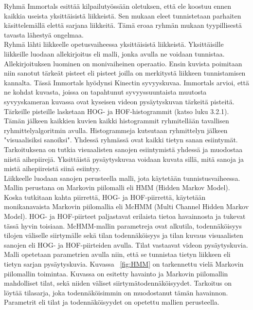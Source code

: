 Ryhmä Immortals esittää kilpailutyössään oletuksen, että ele koostuu ennen kaikkia useista yksittäisistä liikkeistä. 
Sen mukaan eleet tunnistetaan parhaiten käsittelemällä elettä sarjana liikkeitä. Tämä eroaa ryhmän mukaan tyypillisestä 
tavasta lähestyä ongelmaa. \citep {6239185}\\

Ryhmä lähti liikkeelle opetusvaiheessa yksittäisistä liikkeistä. Yksittäisille liikkeille luodaan allekirjoitus eli malli,
jonka avulla ne voidaan tunnistaa. Allekirjoituksen luominen on monivaiheinen operaatio. Ensin kuvista poimitaan niin sanotut
tärkeät pisteet eli pisteet joilla on merkitystä liikkeen tunnistamisen kannalta. Tässä Immortals hyödynsi Kinectin syvyyskuvaa.
Immortals arvioi, että ne kohdat kuvasta, joissa on tapahtunut syvyyssuuntaista muutosta syvyyskameran kuvassa ovat kyseisen videon pysäytyskuvan
tärkeitä pisteitä. Tärkeille pisteille lasketaan HOG- ja HOF-histogrammit (katso luku 3.2.1). 
Tämän jälkeen kaikkien kuvien kaikki histogrammit ryhmitellään tavallisen ryhmittelyalgoritmin avulla.
Histogrammeja kutsutaan ryhmittelyn jälkeen "visuaalisiksi sanoiksi". Yhdessä ryhmässä ovat kaikki tietyn sanan esiintymät.
Tarkoituksena on tutkia visuaalisten sanojen esiintymistä yhdessä ja muodostaa niistä aihepiirejä. 
Yksittäistä pysäytyskuvaa voidaan kuvata sillä, mitä sanoja ja mistä aihepiireistä siinä esiintyy. \citep {6239185}\\

Liikkeelle luodaan sanojen perusteella malli, jota käytetään tunnistusvaiheessa. Mallin perustana on Markovin piilomalli
eli HMM (Hidden Markov Model). Koska tutkitaan kahta piirrettä, HOG- ja HOF-piirrettä, käytetään monikanavaista Markovin piilomallia
 eli McHMM (Multi Channel Hidden Markov Model). HOG- ja HOF-piirteet paljastavat erilaista tietoa havainnosta ja tukevat tässä hyvin toisiaan. 
 McHMM-mallin parametreja ovat alkutila, todennäköisyys tilojen väliselle siirtymälle sekä tilan todennäköisyys ja tilan kuvaus visuaalisten 
 sanojen eli HOG- ja HOF-piirteiden avulla. Tilat vastaavat videon pysäytyskuvia. Malli opetetaan parametrien avulla niin, että se 
 tunnistaa tietyn liikkeen eli tietyn sarjan pysäytyskuvia.\citep {6239185} Kuvassa ~\ref{fig:HMM} on tarkennettu vielä Markovin piilomallin toimintaa. 
 Kuvassa on esitetty havainto ja Markovin piilomallin mahdolliset tilat, sekä niiden väliset siirtymätodennäköisyydet. Tarkoitus on löytää
tilasarja, joka todennäköisimmin on muodostanut tämän havainnon. Parametrit eli tilat ja todennäköisyydet on opetettu mallien perusteella. \\


